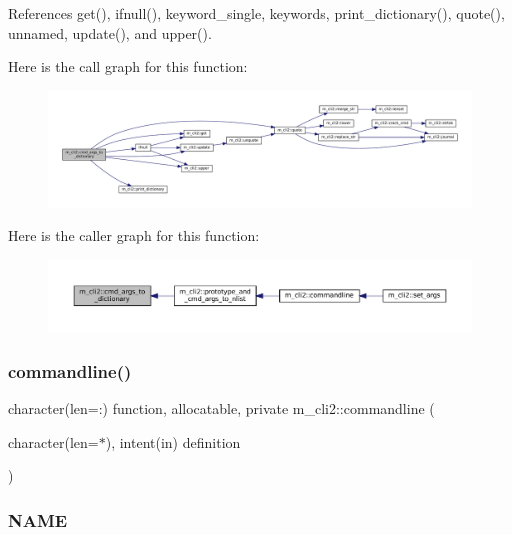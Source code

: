 References get(), ifnull(), keyword\+\_\+single, keywords, print\+\_\+dictionary(), quote(), unnamed, update(), and upper().

Here is the call graph for this function\+:\nopagebreak
\begin{figure}[H]
\begin{center}
\leavevmode
\includegraphics[width=350pt]{namespacem__cli2_a3348b0c76dadd62c536e06f82bcb0331_cgraph}
\end{center}
\end{figure}
Here is the caller graph for this function\+:\nopagebreak
\begin{figure}[H]
\begin{center}
\leavevmode
\includegraphics[width=350pt]{namespacem__cli2_a3348b0c76dadd62c536e06f82bcb0331_icgraph}
\end{center}
\end{figure}
\mbox{\label{namespacem__cli2_a85c38a938a7dd9a749daf8effe45c109}} 
\subsubsection{\texorpdfstring{commandline()}{commandline()}}
{\footnotesize\ttfamily character(len=\+:) function, allocatable, private m\+\_\+cli2\+::commandline (\begin{DoxyParamCaption}\item[{character(len=$\ast$), intent(in)}]{definition }\end{DoxyParamCaption})\hspace{0.3cm}{\ttfamily [private]}}



\subsubsection*{N\+A\+ME}


